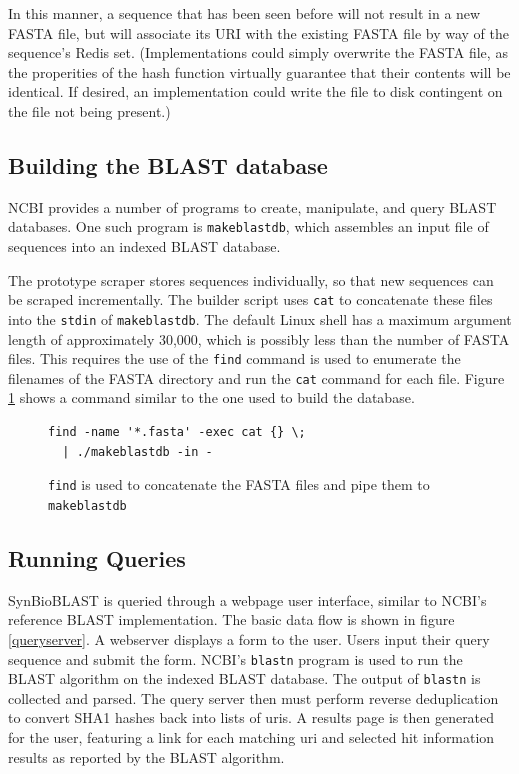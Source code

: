 \documentclass[journal,comsoc]{IEEEtran}
\begin{document}
In this manner, a sequence that has been 
seen before will not result in a new FASTA file, but will associate its URI 
with the existing FASTA file by way of the sequence's Redis set. (Implementations 
could simply overwrite the FASTA file, as the properities of the hash function 
virtually guarantee that their contents will be identical. If desired, an implementation
could write the file to disk contingent on the file not being present.) 

\subsection{Building the BLAST database}

NCBI provides a number of programs to create, manipulate, and query BLAST databases.
One such program is \texttt{makeblastdb}, which assembles an input file of sequences
into an indexed BLAST database. 

The prototype scraper stores sequences individually, so that new sequences can be 
scraped incrementally. The builder script uses \texttt{cat} to concatenate these files
into the \texttt{stdin} of \texttt{makeblastdb}. The default Linux shell has a maximum
argument length of approximately 30,000, which is possibly less than the number of FASTA
files. This requires the use of the \texttt{find} command is used to enumerate the filenames
of the FASTA directory and run the \texttt{cat} command for each file. Figure \ref{builddb} 
shows a command similar to the one used to build the database.

\begin{figure}[!t]
\centering
\begin{lstlisting}
find -name '*.fasta' -exec cat {} \; 
  | ./makeblastdb -in -
\end{lstlisting}
\caption{\texttt{find} is used to concatenate the FASTA files and pipe them to \texttt{makeblastdb}}
\label{builddb}
\end{figure}

\subsection{Running Queries}

SynBioBLAST is queried through a webpage user interface, similar to NCBI's reference
BLAST implementation. The basic data flow is shown in figure \ref{queryserver}. 
A webserver displays a form to the user. Users input their query 
sequence and submit the form. NCBI's \texttt{blastn} program is used to run the BLAST
algorithm on the indexed BLAST database. The output of \texttt{blastn} is collected 
and parsed. The query server then must perform reverse deduplication to convert SHA1
hashes back into lists of uris. A results page is then generated for the user, featuring
a link for each matching uri and selected hit information results as reported by the 
BLAST algorithm.
\end{document}
